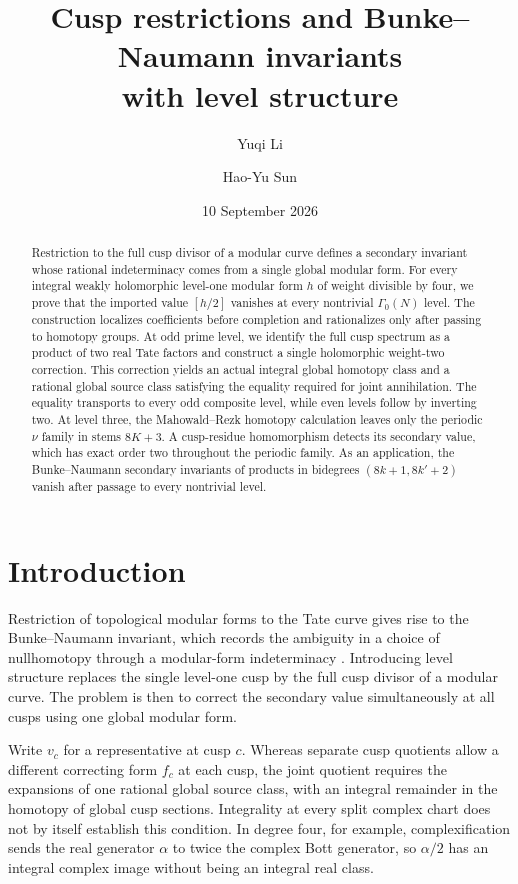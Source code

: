 \documentclass[11pt,a4paper]{amsart}
\title[Cusp restrictions and secondary invariants]{Cusp restrictions and Bunke--Naumann invariants\\with level structure}
\author{Yuqi Li}
\author{Hao-Yu Sun}
\date{10 September 2026}
\theoremstyle{plain}
\theoremstyle{definition}
\theoremstyle{remark}
\begin{document}
\begin{abstract}
Restriction to the full cusp divisor of a modular curve defines a
secondary invariant whose rational indeterminacy comes from a single
global modular form. For every integral weakly holomorphic level-one
modular form $h$ of weight divisible by four, we prove that the
imported value $[h/2]$ vanishes at every nontrivial $\Gamma_0(N)$
level. The construction localizes coefficients before completion
and rationalizes only after passing to homotopy groups. At odd prime
level, we identify the full cusp spectrum as a product of two real
Tate factors and construct a single holomorphic weight-two correction.
This correction yields an actual integral global homotopy class and
a rational global source class satisfying the equality required for
joint annihilation. The equality transports to every odd composite
level, while even levels follow by inverting two. At level three,
the Mahowald--Rezk homotopy calculation leaves only the periodic
$\nu$ family in stems $8K+3$. A cusp-residue homomorphism detects its secondary value, which has
exact order two throughout the periodic family. As an application,
the Bunke--Naumann secondary invariants of products in bidegrees
$(8k+1,8k'+2)$ vanish after passage to every nontrivial level.
\end{abstract}

\maketitle

\section{Introduction}

Restriction of topological modular forms to the Tate curve gives rise
to the Bunke--Naumann invariant, which records the ambiguity in a
choice of nullhomotopy through a modular-form indeterminacy
\cite[Sections~3.7 and~4.3]{BN}. Introducing level structure replaces
the single level-one cusp by the full cusp divisor of a modular curve.
The problem is then to correct the secondary value simultaneously at
all cusps using one global modular form.

Write $v_c$ for a representative at cusp $c$. Whereas separate cusp
quotients allow a different correcting form $f_c$ at each cusp, the
joint quotient requires the expansions of one rational global source
class, with an integral remainder in the homotopy of global cusp
sections. Integrality at every split complex chart does not by itself
establish this condition. In degree four, for example,
complexification sends the real generator $\alpha$ to twice the
complex Bott generator, so $\alpha/2$ has an integral complex image
without being an integral real class.
\end{document}
